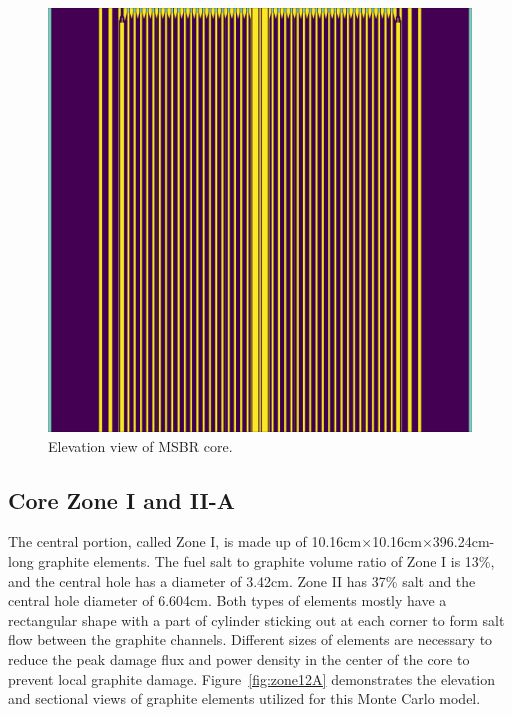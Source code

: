 \documentclass{anstrans}
\begin{document}
\begin{figure}[htbp!] %
  \centering
  \includegraphics[width=\linewidth]{figure_2_2.png}
  \caption{Elevation view of \gls{MSBR} core.}
  \label{fig:elevation}
\end{figure}

\subsection{Core Zone I and II-A}
The central portion, called Zone I, is made up of 10.16cm$\times$10.16cm$\times$396.24cm-long graphite elements. The fuel salt to graphite volume ratio of Zone I is 13\%, and the central hole has a diameter of 3.42cm. Zone II has 37\% salt and the central hole diameter of 6.604cm. Both types of elements mostly have a rectangular shape with a part of cylinder sticking out at each corner to form salt flow between the graphite channels. Different sizes of elements are necessary to reduce the peak damage flux and power density in the center of the core to prevent local graphite damage. Figure~\ref{fig:zone12A} demonstrates the elevation and sectional views of graphite elements utilized for this Monte Carlo model.
\end{document}
